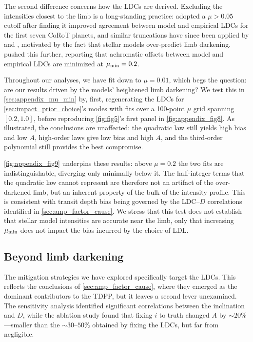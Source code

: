 \documentclass[twocolumn]{aastex631}
\newcommand{\vtwo}[1]{{#1}}
\begin{document}
\vtwo{The second difference concerns how the LDCs are derived. Excluding the intensities closest to the limb is a long-standing practice: \cite{Sing2010} adopted a $\mu > 0.05$ cutoff after finding it improved agreement between model and empirical LDCs for the first seven CoRoT planets, and similar truncations have since been applied by \cite{Claret2018} and \cite{Maxted2023}, motivated by the fact that stellar models over-predict limb darkening. \citetalias{Sing2026} pushed this further, reporting that achromatic offsets between model and empirical LDCs are minimized at $\mu_{\rm min}=0.2$.}

\vtwo{Throughout our analyses, we have fit down to $\mu=0.01$, which begs the question: are our results driven by the models' heightened limb darkening? We test this in \autoref{sec:appendix_mu_min} by, first, regenerating the LDCs for \autoref{sec:impact_prior_choice}'s modes with fits over a 100-point $\mu$ grid spanning $[0.2, 1.0]$, before reproducing \autoref{fig:fig5}'s first panel in \autoref{fig:appendix_fig8}. As illustrated, the conclusions are unaffected: the quadratic law still yields high bias and low $A$, high-order laws give low bias and high $A$, and the third-order polynomial still provides the best compromise.}

\vtwo{\autoref{fig:appendix_fig9} underpins these results: above $\mu=0.2$ the two fits are indistinguishable, diverging only minimally below it. The half-integer terms that the quadratic law cannot represent are therefore not an artifact of the over-darkened limb, but an inherent property of the bulk of the intensity profile. This is consistent with transit depth bias being governed by the LDC--$D$ correlations identified in \autoref{sec:amp_factor_cause}. We stress that this test does not establish that stellar model intensities are accurate near the limb, only that increasing $\mu_{\rm min}$ does not impact the bias incurred by the choice of LDL.}

\subsection{\vtwo{Beyond limb darkening}}\label{sec:orbital_params}
\vtwo{The mitigation strategies we have explored specifically target the LDCs. This reflects the conclusions of \autoref{sec:amp_factor_cause}, where they emerged as the dominant contributors to the TDPP, but it leaves a second lever unexamined. The sensitivity analysis identified significant correlations between the inclination and $D$, while the ablation study found that fixing $i$ to truth changed $A$ by $\sim20\%$---smaller than the $\sim30$--$50\%$ obtained by fixing the LDCs, but far from negligible.}
\end{document}
